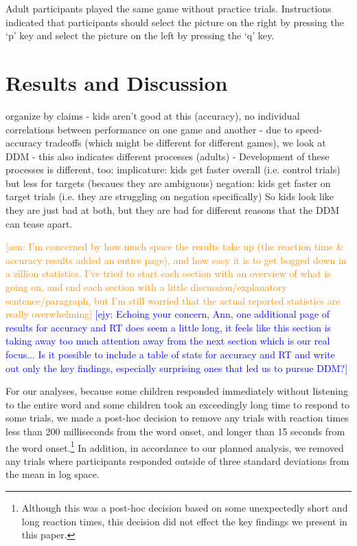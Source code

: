 \documentclass[10pt,letterpaper]{article}
\newcommand{\ejy}[1]{\textcolor{Blue}{[ejy: #1]}}
\newcommand{\aen}[1]{\textcolor{DarkOrange}{[aen: #1]}}
\begin{document}
Adult participants played the same game without practice trials.  Instructions indicated that participants should select the picture on the right by pressing the `p' key and select the picture on the left by pressing the `q' key.  

\section{Results and Discussion}

organize by claims
- kids aren't good at this (accuracy), no individual correlations between performance on one game and another
- due to speed-accuracy tradeoffs (which might be different for different games), we look at DDM
	- this also indicates different processes (adults)
	- Development of these processes is different, too: 
	implicature: kids get faster overall (i.e. control trials) but less for targets (becaues they are ambiguous)
	negation: kids get faster on target trials (i.e. they are struggling on negation specifically)
	So kids look like they are just bad at both, but they are bad for different reasons that the DDM can tease 	apart.

\aen{I'm concerned by how much space the results take up (the reaction time \& accuracy results added an entire page), and how easy it is to get bogged down in a zillion statistics.  I've tried to start each section with an overview of what is going on, and end each section with a little discussion/explanatory sentence/paragraph, but I'm still worried that the actual reported statistics are really overwhelming}
\ejy{Echoing your concern, Ann, one additional page of results for accuracy and RT does seem a little long, it feels like this section is taking away too much attention away from the next section which is our real focus... Is it possible to include a table of stats for accuracy and RT and write out only the key findings, especially surprising ones that led us to pursue DDM?}

For our analyses, because some children responded immediately without listening to the entire word and some children took an exceedingly long time to respond to some trials, we made a post-hoc decision to remove any trials with reaction times less than 200 milliseconds from the word onset, and longer than 15 seconds from the word onset.\footnote{Although this was a post-hoc decision based on some unexpectedly short and long reaction times, this decision did not effect the key findings we present in this paper.}  In addition, in accordance to our planned analysis, we removed any trials where participants responded outside of three standard deviations from the mean in log space.
\end{document}
